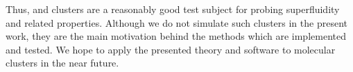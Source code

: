 Thus,  and \paraH{} clusters are a reasonably good test subject for probing superfluidity and related properties.
Although we do not simulate such clusters in the present work, they are the main motivation behind the methods which are implemented and tested.
We hope to apply the presented theory and software to molecular clusters in the near future.
